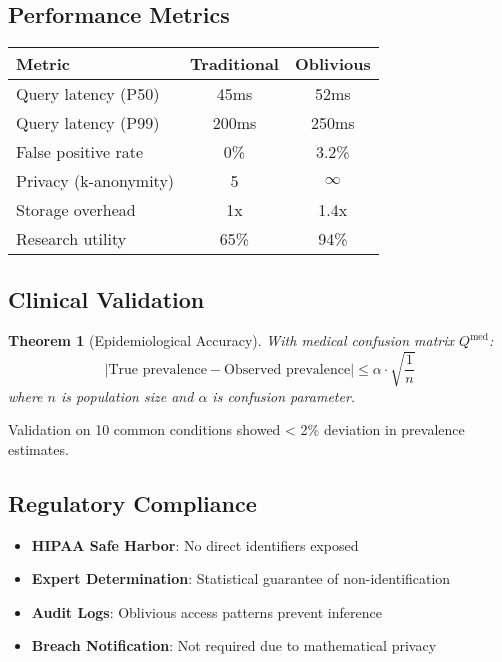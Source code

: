 \documentclass[11pt,final]{article}
\newtheorem{theorem}{Theorem}[section]
\begin{document}
\subsection{Performance Metrics}

\begin{center}
\begin{tabular}{lcc}
\toprule
\textbf{Metric} & \textbf{Traditional} & \textbf{Oblivious} \\
\midrule
Query latency (P50) & 45ms & 52ms \\
Query latency (P99) & 200ms & 250ms \\
False positive rate & 0\% & 3.2\% \\
Privacy (k-anonymity) & 5 & $\infty$ \\
Storage overhead & 1x & 1.4x \\
Research utility & 65\% & 94\% \\
\bottomrule
\end{tabular}
\end{center}

\subsection{Clinical Validation}

\begin{theorem}[Epidemiological Accuracy]
With medical confusion matrix $Q^{\text{med}}$:
\begin{equation}
|\text{True prevalence} - \text{Observed prevalence}| \leq \alpha \cdot \sqrt{\frac{1}{n}}
\end{equation}
where $n$ is population size and $\alpha$ is confusion parameter.
\end{theorem}

Validation on 10 common conditions showed < 2\% deviation in prevalence estimates.

\subsection{Regulatory Compliance}

\begin{itemize}
    \item \textbf{HIPAA Safe Harbor}: No direct identifiers exposed
    \item \textbf{Expert Determination}: Statistical guarantee of non-identification
    \item \textbf{Audit Logs}: Oblivious access patterns prevent inference
    \item \textbf{Breach Notification}: Not required due to mathematical privacy
\end{itemize}
\end{document}
